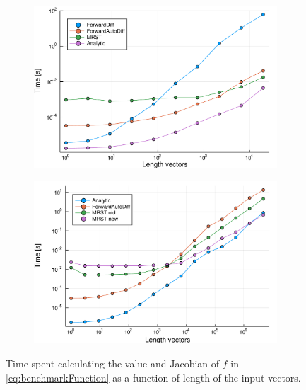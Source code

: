 \begin{figure}[H]
    \centering
    \begin{subfigure}[t]{0.48\textwidth}
        \centering
        \includegraphics[width = \textwidth]{figures/benchmark_all_ADs.pdf}
        \caption{}
        \label{fig:benchmarkAllADs}
    \end{subfigure}
    \begin{subfigure}[t]{0.49\textwidth}
        \centering
        \includegraphics[width = \textwidth]{figures/benchmark_long_vectors_4.pdf}
        \caption{}
        \label{fig:benchmarkLongVectors}
    \end{subfigure}
    \caption{Time spent calculating the value and Jacobian of $f$ in \eqref{eq:benchmarkFunction} as a function of length of the input vectors.}
    \label{fig:benchmarkAD}
\end{figure}
